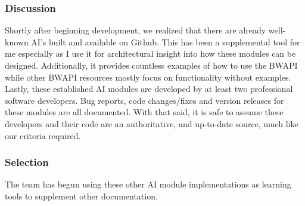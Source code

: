 \subsubsection{Discussion}
Shortly after beginning development, we realized that there are already well-known AI's built and available on Github. This has been a supplemental tool for me especially as I use it for architectural insight into how these modules can be designed. Additionally, it provides countless examples of how to use the BWAPI while other BWAPI resources mostly focus on functionality without examples. Lastly, these established AI modules are developed by at least two professional software developers. Bug reports, code changes/fixes and version releases for these modules are all documented. With that said, it is safe to assume these developers and their code are an authoritative, and up-to-date source, much like our criteria required. 
\subsubsection{Selection}
The team has begun using these other AI module implementations as learning tools to supplement other documentation.
